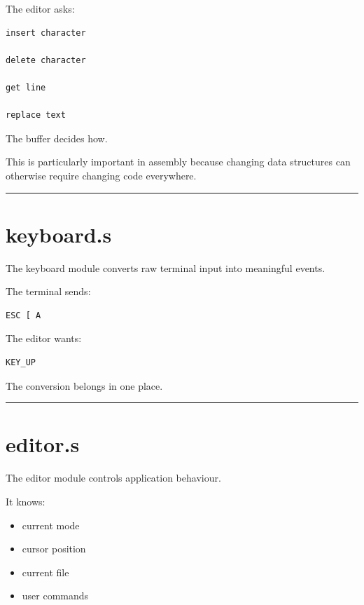 \documentclass[
  oneside,
  openany]{book}
\providecommand{\tightlist}{%
  \setlength{\itemsep}{0pt}\setlength{\parskip}{0pt}}
\begin{document}
The editor asks:

\begin{verbatim}
insert character

delete character

get line

replace text
\end{verbatim}

The buffer decides how.

This is particularly important in assembly because changing data
structures can otherwise require changing code everywhere.

\begin{center}\rule{0.5\linewidth}{0.5pt}\end{center}

\hypertarget{keyboard.s}{%
\section{keyboard.s}\label{keyboard.s}}

The keyboard module converts raw terminal input into meaningful events.

The terminal sends:

\begin{verbatim}
ESC [ A
\end{verbatim}

The editor wants:

\begin{verbatim}
KEY_UP
\end{verbatim}

The conversion belongs in one place.

\begin{center}\rule{0.5\linewidth}{0.5pt}\end{center}

\hypertarget{editor.s}{%
\section{editor.s}\label{editor.s}}

The editor module controls application behaviour.

It knows:

\begin{itemize}
\tightlist
\item
  current mode
\item
  cursor position
\item
  current file
\item
  user commands
\end{itemize}
\end{document}
